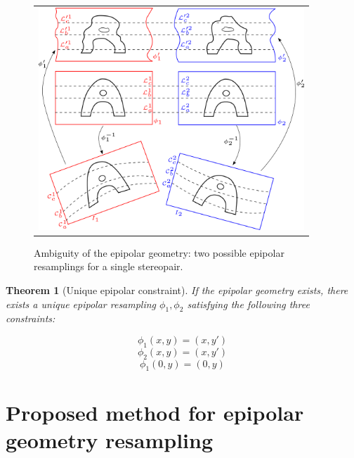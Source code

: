 \documentclass{ipol}
\newtheorem{theorem}{Theorem}
\begin{document}
\begin{figure}
\centering
\begin{tabular}{c}
\includegraphics[width=10cm]{FIGS/AmbigEpip.png}
\end{tabular}
\caption{Ambiguity of the epipolar geometry: two possible epipolar resamplings for a single stereopair.}
\label{FigAmbigEpip}
\end{figure}




\begin{theorem}[Unique epipolar constraint]

If the epipolar geometry exists, there exists a unique epipolar resampling $\phi_1,\phi_2$ satisfying the  following three constraints:

\begin{equation}
    \phi_1(x,y) = (x,y') \label{Ambig:PhiO}
\end{equation}
\begin{equation}
    \phi_2(x,y) = (x,y') \label{Ambig:PhiT}
\end{equation}
\begin{equation}
    \phi_1(0,y) = (0,y) \label{Ambig:Line}
\end{equation}
\label{Theo:Fix:Ambig}

\end{theorem}




\section{Proposed method for epipolar geometry resampling}\label{sec:method}
\end{document}
